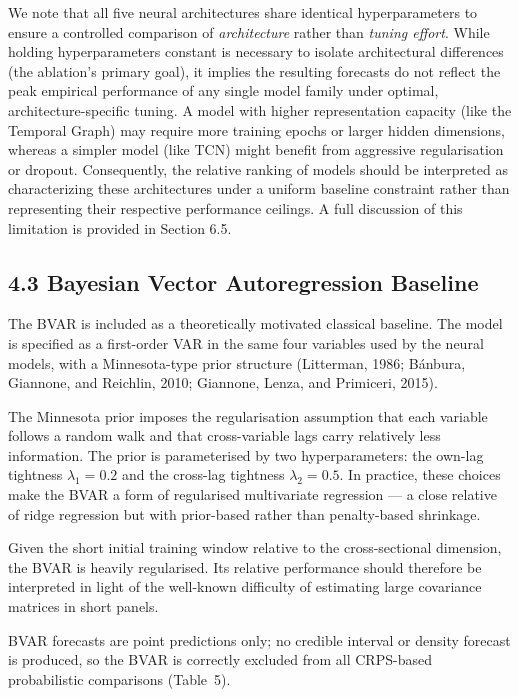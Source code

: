 \documentclass[
]{article}
\newcounter{none} %
\begin{document}
We note that all five neural architectures share identical hyperparameters to ensure a controlled comparison of \emph{architecture} rather than \emph{tuning effort}. While holding hyperparameters constant is necessary to isolate architectural differences (the ablation's primary goal), it implies the resulting forecasts do not reflect the peak empirical performance of any single model family under optimal, architecture-specific tuning. A model with higher representation capacity (like the Temporal Graph) may require more training epochs or larger hidden dimensions, whereas a simpler model (like TCN) might benefit from aggressive regularisation or dropout. Consequently, the relative ranking of models should be interpreted as characterizing these architectures under a uniform baseline constraint rather than representing their respective performance ceilings. A full discussion of this limitation is provided in Section 6.5.

\subsection{4.3 Bayesian Vector Autoregression Baseline}\label{bvar-baseline}

The BVAR is included as a theoretically motivated classical baseline. The model is specified as a first-order VAR in the same four variables used by the neural models, with a Minnesota-type prior structure (Litterman, 1986; B\'{a}nbura, Giannone, and Reichlin, 2010; Giannone, Lenza, and Primiceri, 2015).

The Minnesota prior imposes the regularisation assumption that each variable follows a random walk and that cross-variable lags carry relatively less information. The prior is parameterised by two hyperparameters: the own-lag tightness $\lambda_1 = 0.2$ and the cross-lag tightness $\lambda_2 = 0.5$. In practice, these choices make the BVAR a form of regularised multivariate regression --- a close relative of ridge regression but with prior-based rather than penalty-based shrinkage.

Given the short initial training window relative to the cross-sectional dimension, the BVAR is heavily regularised. Its relative performance should therefore be interpreted in light of the well-known difficulty of estimating large covariance matrices in short panels.

BVAR forecasts are point predictions only; no credible interval or density forecast is produced, so the BVAR is correctly excluded from all CRPS-based probabilistic comparisons (Table~5).
\end{document}
